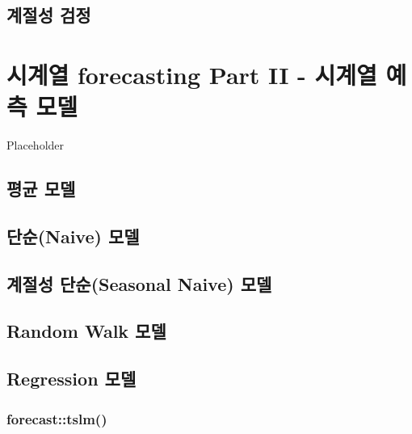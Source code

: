\documentclass[
]{book}
\begin{document}
\hypertarget{uxacc4uxc808uxc131-uxac80uxc815}{%
\section{계절성 검정}\label{uxacc4uxc808uxc131-uxac80uxc815}}

\hypertarget{uxc2dcuxacc4uxc5f4-forecasting-part-ii---uxc2dcuxacc4uxc5f4-uxc608uxce21-uxbaa8uxb378}{%
\chapter{시계열 forecasting Part II - 시계열 예측 모델}\label{uxc2dcuxacc4uxc5f4-forecasting-part-ii---uxc2dcuxacc4uxc5f4-uxc608uxce21-uxbaa8uxb378}}

Placeholder

\hypertarget{uxd3c9uxade0-uxbaa8uxb378}{%
\section{평균 모델}\label{uxd3c9uxade0-uxbaa8uxb378}}

\hypertarget{uxb2e8uxc21cnaive-uxbaa8uxb378}{%
\section{단순(Naive) 모델}\label{uxb2e8uxc21cnaive-uxbaa8uxb378}}

\hypertarget{uxacc4uxc808uxc131-uxb2e8uxc21cseasonal-naive-uxbaa8uxb378}{%
\section{계절성 단순(Seasonal Naive) 모델}\label{uxacc4uxc808uxc131-uxb2e8uxc21cseasonal-naive-uxbaa8uxb378}}

\hypertarget{random-walk-uxbaa8uxb378}{%
\section{Random Walk 모델}\label{random-walk-uxbaa8uxb378}}

\hypertarget{regression-uxbaa8uxb378}{%
\section{Regression 모델}\label{regression-uxbaa8uxb378}}

\hypertarget{forecasttslm}{%
\subsection{forecast::tslm()}\label{forecasttslm}}
\end{document}
